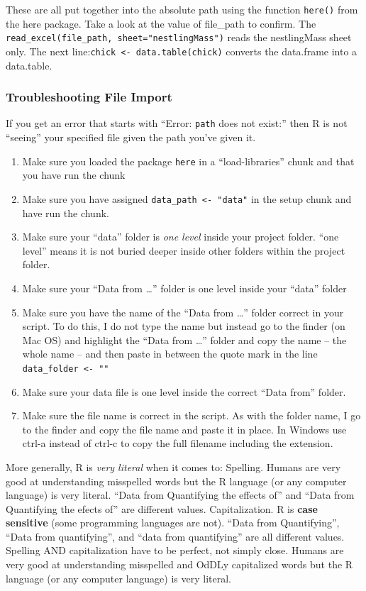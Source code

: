 \documentclass[]{book}
\providecommand{\tightlist}{%
  \setlength{\itemsep}{0pt}\setlength{\parskip}{0pt}}
\begin{document}
These are all put together into the absolute path using the function
\texttt{here()} from the here package. Take a look at the value of
file\_path to confirm. The
\texttt{read\_excel(file\_path,\ sheet="nestlingMass")} reads the
nestlingMass sheet only. The next
line:\texttt{chick\ \textless{}-\ data.table(chick)} converts the
data.frame into a data.table.

\subsubsection{Troubleshooting File
Import}\label{troubleshooting-file-import}

If you get an error that starts with ``Error: \texttt{path} does not
exist:'' then R is not ``seeing'' your specified file given the path
you've given it.

\begin{enumerate}
\def\labelenumi{\arabic{enumi}.}
\tightlist
\item
  Make sure you loaded the package \texttt{here} in a ``load-libraries''
  chunk and that you have run the chunk
\item
  Make sure you have assigned \texttt{data\_path\ \textless{}-\ "data"}
  in the setup chunk and have run the chunk.
\item
  Make sure your ``data'' folder is \emph{one level} inside your project
  folder. ``one level'' means it is not buried deeper inside other
  folders within the project folder.
\item
  Make sure your ``Data from \ldots{}'' folder is one level inside your
  ``data'' folder
\item
  Make sure you have the name of the ``Data from \ldots{}'' folder
  correct in your script. To do this, I do not type the name but instead
  go to the finder (on Mac OS) and highlight the ``Data from \ldots{}''
  folder and copy the name -- the whole name -- and then paste in
  between the quote mark in the line
  \texttt{data\_folder\ \textless{}-\ ""}
\item
  Make sure your data file is one level inside the correct ``Data from''
  folder.
\item
  Make sure the file name is correct in the script. As with the folder
  name, I go to the finder and copy the file name and paste it in place.
  In Windows use ctrl-a instead of ctrl-c to copy the full filename
  including the extension.
\end{enumerate}

More generally, R is \emph{very literal} when it comes to: Spelling.
Humans are very good at understanding misspelled words but the R
language (or any computer language) is very literal. ``Data from
Quantifying the effects of'' and ``Data from Quantifying the efects of''
are different values. Capitalization. R is \textbf{case sensitive} (some
programming languages are not). ``Data from Quantifying'', ``Data from
quantifying'', and ``data from quantifying'' are all different values.
Spelling AND capitalization have to be perfect, not simply close. Humans
are very good at understanding misspelled and OdDLy capitalized words
but the R language (or any computer language) is very literal.
\end{document}

